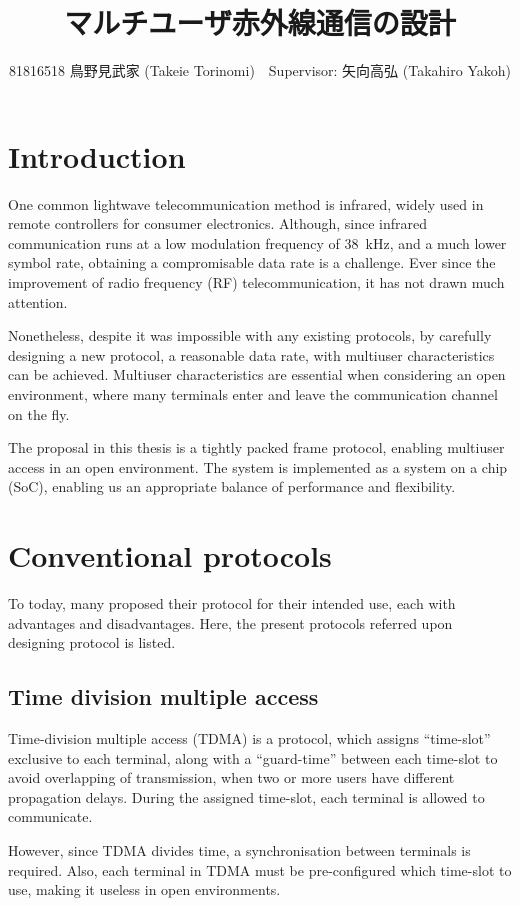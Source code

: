 ﻿\documentclass[twocolumn,9pt]{ltjsarticle}
\title{マルチユーザ赤外線通信の設計}
\author{81816518 鳥野見武家 (Takeie Torinomi)　Supervisor: 矢向高弘 (Takahiro Yakoh)}
\begin{document}
\maketitle
\section{Introduction}
One common lightwave telecommunication method is infrared, widely used in remote controllers for consumer electronics.
Although, since infrared communication runs at a low modulation frequency of \SI{38}{kHz}, and a much lower symbol rate, obtaining a compromisable data rate is a challenge.
Ever since the improvement of radio frequency (RF) telecommunication, it has not drawn much attention.

Nonetheless, despite it was impossible with any existing protocols, by carefully designing a new protocol, a reasonable data rate, with multiuser characteristics can be achieved.
Multiuser characteristics are essential when considering an open environment, where many terminals enter and leave the communication channel on the fly.

The proposal in this thesis is a tightly packed frame protocol, enabling multiuser access in an open environment.
The system is implemented as a system on a chip (SoC), enabling us an appropriate balance of performance and flexibility.

\section{Conventional protocols}
To today, many proposed their protocol for their intended use, each with advantages and disadvantages.
Here, the present protocols referred upon designing protocol is listed.

\subsection{Time division multiple access}
Time-division multiple access (TDMA) is a protocol, which assigns ``time-slot'' exclusive to each terminal, along with a ``guard-time'' between each time-slot to avoid overlapping of transmission, when two or more users have different propagation delays.
During the assigned time-slot, each terminal is allowed to communicate.

However, since TDMA divides time, a synchronisation between terminals is required.
Also, each terminal in TDMA must be pre-configured which time-slot to use, making it useless in open environments.
\end{document}
